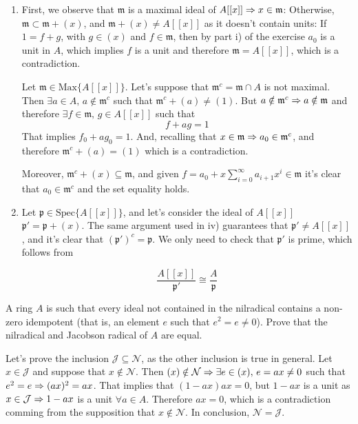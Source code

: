 \begin{sol}
\begin{enumerate}[label=(\roman*)]
		\item First, we observe that $\mathfrak{m}$ is a maximal ideal of $A[[x]] \Rightarrow x \in \mathfrak{m}$: Otherwise, $\mathfrak{m} \subset \mathfrak{m} + (x)$, and $\mathfrak{m} + (x) \neq A[[x]]$ as it doesn't contain units: If $1 = f + g$, with $g \in (x)$ and $f \in \mathfrak{m}$, then by part i) of the exercise $a_0$ is a unit in $A$, which implies $f$ is a unit and therefore $\mathfrak{m} = A[[x]]$, which is a contradiction.

		Let $\mathfrak{m} \in \text{Max}\{A[[x]]\}$. Let's suppose that $\mathfrak{m}^c = \mathfrak{m} \cap A$ is not maximal. Then $\exists a \in A, \, a \notin \mathfrak{m}^c$ such that $\mathfrak{m}^c + (a) \neq (1)$. But $a \notin \mathfrak{m}^c \Rightarrow a \notin \mathfrak{m}$ and therefore $\exists f \in \mathfrak{m}, \, g \in A[[x]]$ such that 
		\[
			f + ag = 1
		\]
		That implies $f_0 + ag_0 = 1$. And, recalling that $x \in \mathfrak{m} \Rightarrow a_0 \in \mathfrak{m}^c$, and therefore $\mathfrak{m}^c + (a) = (1)$ which is a contradiction.


		Moreover, $\mathfrak{m}^c + (x) \subseteq \mathfrak{m}$, and given $f = a_0 + x \sum_{i = 0}^\infty a_{i+1} x^i \in \mathfrak{m}$ it's clear that $a_0 \in \mathfrak{m}^c$ and the set equality holds.

		\item Let $\mathfrak{p} \in \text{Spec}\{A[[x]]\}$, and let's consider the ideal of $A[[x]]$ $\mathfrak{p}' = \mathfrak{p} + (x)$. The same argument used in iv) guarantees that $\mathfrak{p}' \neq A[[x]]$, and it's clear that $(\mathfrak{p}')^c = \mathfrak{p}$. We only need to check that $\mathfrak{p}'$ is prime, which follows from

		\[
			\frac{A[[x]]}{\mathfrak{p}'} \cong \frac{A}{\mathfrak{p}}
		\]
	\end{enumerate}


\end{sol}


\begin{ex}
A ring $A$ is such that every ideal not contained in the nilradical contains a non-zero idempotent (that is, an element $e$ such that $e^2 = e \neq 0$). Prove that the nilradical and Jacobson radical of $A$ are equal.
\end{ex}

\begin{sol}
 Let's prove the inclusion $\mathcal{J} \subseteq \mathcal{N}$, as the other inclusion is true in general. Let $x \in \mathcal{J}$ and suppose that $x \notin \mathcal{N}$. Then $(x) \notin \mathcal{N} \Rightarrow \exists e \in (x), \, e = ax \neq 0$ such that $e^2 = e \Rightarrow (ax)^2 = ax$. That implies that $(1-ax)ax = 0$, but $1-ax$ is a unit as $x \in \mathcal{J} \Rightarrow 1-ax$ is a unit $\forall a \in A$. Therefore $ax = 0$, which is a contradiction comming from the supposition that $x \notin \mathcal{N}$. In conclusion, $\mathcal{N} = \mathcal{J}$.
\end{sol}

